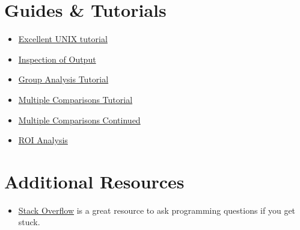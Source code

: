 \documentclass[paper=a4, fontsize=11pt]{scrartcl} %
\numberwithin{equation}{section} %
\numberwithin{figure}{section} %
\numberwithin{table}{section} %
\begin{document}
\begin{appendices}
\section{Guides \& Tutorials}
\begin{itemize}
\item \href{http://www.ee.surrey.ac.uk/Teaching/Unix/}{Excellent UNIX tutorial}
\item \href{https://surfer.nmr.mgh.harvard.edu/fswiki/FsTutorial/OutputData_freeview}{Inspection of Output}
\item \href{http://surfer.nmr.mgh.harvard.edu/fswiki/FsTutorial/GroupAnalysis}{Group Analysis Tutorial}
\item \href{http://surfer.nmr.mgh.harvard.edu/fswiki/FsTutorial/GroupAnalysis#ClusterwiseCorrectionforMultipleComparisons}{Multiple 
Comparisons Tutorial}
\item \href{http://surfer.nmr.mgh.harvard.edu/fswiki/FsTutorial/QdecMultipleComparisons}{Multiple Comparisons Continued}
\item \href{https://surfer.nmr.mgh.harvard.edu/fswiki/FsTutorial/AnatomicalROI}{ROI Analysis}
\end{itemize}
\section{Additional Resources}
\begin{itemize}
\item \href{http://stackoverflow.com}{Stack Overflow} is a great resource to ask programming questions if you get stuck.
\end{itemize}
\end{appendices}


 
\end{document}
